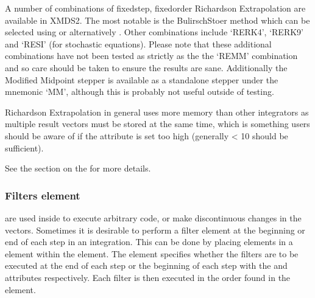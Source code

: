 \documentclass[letterpaper,10pt,english]{sphinxmanual}
\begin{document}
\sphinxAtStartPar
A number of combinations of fixed\sphinxhyphen{}step, fixed\sphinxhyphen{}order Richardson Extrapolation are available in XMDS2. The most notable is the Bulirsch\sphinxhyphen{}Stoer method which can be selected using  or alternatively . Other combinations include ‘RERK4’, ‘RERK9’ and ‘RESI’ (for stochastic equations). Please note that these additional combinations have not been tested as strictly as the the ‘REMM’ combination and so care should be taken to ensure the results are sane. Additionally the Modified Midpoint stepper is available as a standalone stepper under the mnemonic ‘MM’, although this is probably not useful outside of testing.

\sphinxAtStartPar
Richardson Extrapolation in general uses more memory than other integrators as multiple result vectors must be stored at the same time, which is something users should be aware of if the  attribute is set too high (generally \textless{} 10 should be sufficient).

\sphinxAtStartPar
See the section on the {\hyperref[\detokenize{bulirschStoer:mmdetail}]{}} for more details.

\ignorespaces 

\subsubsection{Filters element}
\label{\detokenize{reference_elements:filters-element}}\label{\detokenize{reference_elements:filterselement}}\label{\detokenize{reference_elements:index-86}}
\sphinxAtStartPar
{\hyperref[\detokenize{reference_elements:filterelement}]{}} are used inside {\hyperref[\detokenize{reference_elements:sequenceelement}]{}} to execute arbitrary code, or make discontinuous changes in the vectors.  Sometimes it is desirable to perform a filter element at the beginning or end of each step in an integration.  This can be done by placing  elements in a  element within the  element.  The  element specifies whether the filters are to be executed at the end of each step or the beginning of each step with the  and  attributes respectively.  Each filter
is then executed in the order found in the  element.
\end{document}
